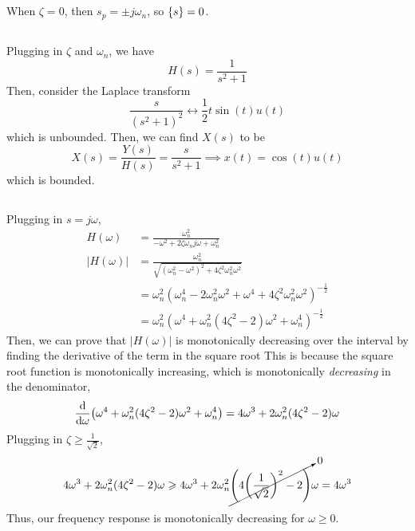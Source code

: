 \documentclass{article}
\let\Re\relax
\DeclareMathOperator{\Re}{\mathfrak{R}}
\begin{document}
\subsection{}

When \(\zeta = 0\), then \(s_p = \pm j\omega_n\), so \(\Re\{s\} = 0\).

\subsection{}

Plugging in \(\zeta\) and \(\omega_n\), we have
\begin{equation}
    H(s) = \frac{1}{s^2 + 1}
\end{equation}
Then, consider the Laplace transform
\begin{equation}
    \frac{s}{(s^2 + 1)^2} \longleftrightarrow \frac{1}{2} t \sin(t) u(t)
\end{equation}
which is unbounded.
Then, we can find \(X(s)\) to be
\begin{equation}
    X(s) = \frac{Y(s)}{H(s)} = \frac{s}{s^2 + 1} \implies x(t) = \cos(t) u(t)
\end{equation}
which is bounded.

\subsection{}

Plugging in \(s = j \omega\),
\begin{align}
    H(\omega) &= \frac{\omega_n^2}{-\omega^2 + 2 \zeta \omega_n j \omega + \omega_n^2} \\
    |H(\omega)| &= \frac{\omega_n^2}{\sqrt{(\omega_n^2 - \omega^2)^2 + 4 \zeta^2 \omega_n^2 \omega^2}} \\
    &= \omega_n^2 (\omega_n^4 - 2\omega_n^2 \omega^2 + \omega^4 + 4 \zeta^2 \omega_n^2 \omega^2)^{-\frac{1}{2}} \\
    &= \omega_n^2 (\omega^4 + \omega_n^2 (4 \zeta^2 - 2) \omega^2 + \omega_n^4)^{-\frac{1}{2}}
\end{align}
Then, we can prove that \(|H(\omega)|\) is monotonically decreasing over the interval by finding the derivative of the term in the square root
This is because the square root function is monotonically increasing, which is monotonically \emph{decreasing} in the denominator,
\begin{equation}
    \dv{\omega} (\omega^4 + \omega_n^2 (4 \zeta^2 - 2) \omega^2 + \omega_n^4) = 4\omega^3 + 2\omega_n^2 (4\zeta^2 - 2) \omega
\end{equation}
Plugging in \(\zeta \geqslant \frac{1}{\sqrt{2}}\),
\begin{equation}
    4\omega^3 + 2\omega_n^2 (4\zeta^2 - 2) \omega \geqslant 4\omega^3 + 2\omega_n^2 \cancelto{0}{\qty(4 \qty(\frac{1}{\sqrt{2}})^2 - 2)} \omega = 4\omega^3
\end{equation}
Thus, our frequency response is monotonically decreasing for \(\omega \geqslant 0\).
\end{document}
